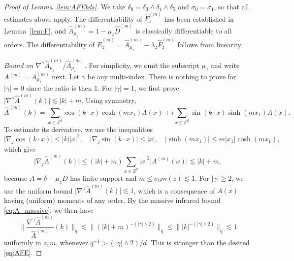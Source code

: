 \documentclass[11pt,hidelinks]{article}
\theoremstyle{plain}
\numberwithin{equation}{section}
\newcommand{\Z}{\mathbb{Z}}
\newcommand{\grad}{\nabla}
\newcommand{\inv}{^{-1}}
\renewcommand{\(}{\left(}
\renewcommand{\)}{\right)}
\newcommand{\1}{\mathds{1}}
\providecommand{\abs}[1]{\lvert#1\rvert}
\providecommand{\bignorm}[1]{\big\lVert#1\big\rVert}
\providecommand{\biggnorm}[1]{\bigg\lVert#1\bigg\rVert}
\newcommand{\mz}{m(z)}
\newcommand{\muz}{{\mu_z}}
\newcommand{\supm}{^{(m)}}
\begin{document}
\begin{proof}[Proof of Lemma~\ref{lem:AFEbds}]
We take $\delta_0 = \delta_3 \wedge \delta_4 \wedge \delta_5$ and $\sigma_0 = \sigma_1$,
so that all estimates above apply. 
The differentiability of $\hat F_z\supm$ has been established in Lemma~\ref{lem:F}, and $\hat A\supm_\muz = 1 - \muz \hat D \supm$ is classically differentiable to all orders. 
The differentiability of $\hat E_z \supm = \hat A_\muz \supm - \lambda_z \hat F_z \supm$ follows from linearity.

\medskip\noindent
\emph{Bound on $\grad^\gamma \hat A_\muz\supm / \hat A_\muz\supm$.}
For simplicity, we omit the subscript $\muz$ and write $A\supm = A_\muz\supm$ next. Let $\gamma$ be any multi-index.
There is nothing to prove for $\abs \gamma=0$ since the ratio is then $1$.
For $\abs \gamma = 1$, 
we first prove $\abs{ \grad^\gamma \hat A\supm(k) } \lesssim \abs k + m$. 
Using symmetry, 
\begin{equation}
\hat A\supm(k) = 
	\sum_{x\in \Z^d} \cos (k\cdot x) \cosh (mx_1) A(x) 
	+ i \sum_{x\in \Z^d} \sin (k\cdot x) \sinh (mx_1) A(x). 
\end{equation}
To estimate its derivative, we use the inequalities
\begin{equation}
\abs{ \grad_j \cos (k\cdot x) } \le \abs k \abs x^2,  \quad
\abs{ \grad_j \sin (k\cdot x) }  \le \abs x, \quad
\abs{ \sinh (mx_1) } \le m \abs{ x_1} \cosh (mx_1), 
\end{equation}
which give
\begin{equation} \label{eq:DAm}
\abs{ \grad_j \hat A\supm(k) } 
\le  (\abs k + m) \sum_{x\in \Z^d} \abs x^2 \abs{ A\supm(x) } 
\lesssim \abs k + m, 
\end{equation}
because $A = \delta - \muz D$ has finite support and $m \le \sigma_0 \mz \lesssim 1$. 
For $\abs \gamma \ge 2$, 
we use the uniform bound $\abs{ \grad^\gamma \hat A\supm (k) } \lesssim 1$, which is a consequence of $A(x)$ having (uniform) moments of any order.
By the massive infrared bound \eqref{eq:A_massive}, we then have
\begin{equation}
\biggnorm{ \frac{ \grad^\gamma \hat A \supm }{ \hat A\supm } (k) }_q
\lesssim \bignorm{ (\abs k + m)^{- (\abs \gamma \wedge 2 ) } }_q
\le  \bignorm{ \abs k^{-(\abs \gamma \wedge 2)} }_q
\lesssim 1
\end{equation}
uniformly in $z,m$, 
whenever $q\inv > (\abs \gamma \wedge 2) / d$.
This is stronger than the desired \eqref{eq:AFE}. 



\end{proof}
\end{document}
